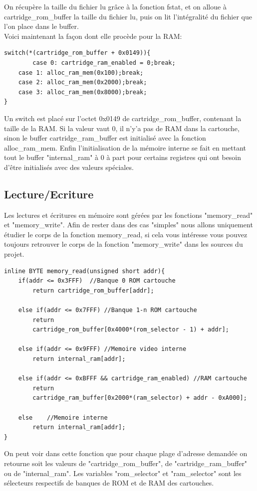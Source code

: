 \documentclass{report}
\begin{document}
On récupère la taille du fichier lu grâce à la fonction fstat, et on alloue à cartridge\_rom\_buffer la taille du fichier lu, puis on lit l'intégralité du fichier que l'on place dans le buffer.\\
Voici maintenant la façon dont elle procède pour la RAM:
\begin{lstlisting}
switch(*(cartridge_rom_buffer + 0x0149)){
       	case 0: cartridge_ram_enabled = 0;break;
	case 1: alloc_ram_mem(0x100);break;
	case 2: alloc_ram_mem(0x2000);break;
	case 3: alloc_ram_mem(0x8000);break;
}
\end{lstlisting}
Un switch est placé sur l'octet 0x0149 de cartridge\_rom\_buffer, contenant la taille de la RAM. Si la valeur vaut 0, il n'y'a pas de RAM dans la cartouche, sinon le buffer cartridge\_ram\_buffer est initialisé avec la fonction alloc\_ram\_mem.
Enfin l'initialisation de la mémoire interne se fait en mettant tout le buffer "internal\_ram" à 0 à part pour certains registres qui ont besoin d'être initialisés avec des valeurs spéciales.
\subsection{Lecture/Ecriture}
Les lectures et écritures en mémoire sont gérées par les fonctions "memory\_read" et "memory\_write". Afin de rester dans des cas "simples" nous allons uniquement étudier le corps de la fonction memory\_read, si cela vous intéresse vous pouvez toujours retrouver le corps de la fonction "memory\_write" dans les sources du projet.
\begin{lstlisting}
inline BYTE memory_read(unsigned short addr){
	if(addr <= 0x3FFF) 	//Banque 0 ROM cartouche
		return cartridge_rom_buffer[addr];

	else if(addr <= 0x7FFF) //Banque 1-n ROM cartouche
		return 
		cartridge_rom_buffer[0x4000*(rom_selector - 1) + addr];

	else if(addr <= 0x9FFF) //Memoire video interne
		return internal_ram[addr];

	else if(addr <= 0xBFFF && cartridge_ram_enabled) //RAM cartouche
		return 
		cartridge_ram_buffer[0x2000*(ram_selector) + addr - 0xA000];

	else 	//Memoire interne
		return internal_ram[addr];
}
\end{lstlisting}
On peut voir dans cette fonction que pour chaque plage d'adresse demandée on retourne soit les valeurs de "cartridge\_rom\_buffer", de "cartridge\_ram\_buffer" ou de "internal\_ram".
Les variables "rom\_selector" et "ram\_selector" sont les sélecteurs respectifs de banques de ROM et de RAM des cartouches.
\end{document}
